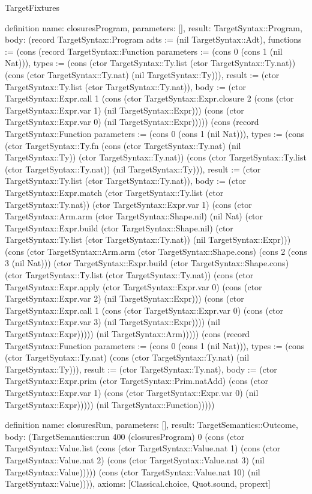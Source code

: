 \begin{lexlean}{TargetFixtures}
\begin{semanticmodule}
definition{
  name: closuresProgram,
  parameters: [],
  result: TargetSyntax::Program,
  body: (record TargetSyntax::Program {adts := (nil TargetSyntax::Adt), functions := (cons (record TargetSyntax::Function {parameters := (cons 0 (cons 1 (nil Nat))), types := (cons (ctor TargetSyntax::Ty.list (ctor TargetSyntax::Ty.nat)) (cons (ctor TargetSyntax::Ty.nat) (nil TargetSyntax::Ty))), result := (ctor TargetSyntax::Ty.list (ctor TargetSyntax::Ty.nat)), body := (ctor TargetSyntax::Expr.call 1 (cons (ctor TargetSyntax::Expr.closure 2 (cons (ctor TargetSyntax::Expr.var 1) (nil TargetSyntax::Expr))) (cons (ctor TargetSyntax::Expr.var 0) (nil TargetSyntax::Expr))))}) (cons (record TargetSyntax::Function {parameters := (cons 0 (cons 1 (nil Nat))), types := (cons (ctor TargetSyntax::Ty.fn (cons (ctor TargetSyntax::Ty.nat) (nil TargetSyntax::Ty)) (ctor TargetSyntax::Ty.nat)) (cons (ctor TargetSyntax::Ty.list (ctor TargetSyntax::Ty.nat)) (nil TargetSyntax::Ty))), result := (ctor TargetSyntax::Ty.list (ctor TargetSyntax::Ty.nat)), body := (ctor TargetSyntax::Expr.match (ctor TargetSyntax::Ty.list (ctor TargetSyntax::Ty.nat)) (ctor TargetSyntax::Expr.var 1) (cons (ctor TargetSyntax::Arm.arm (ctor TargetSyntax::Shape.nil) (nil Nat) (ctor TargetSyntax::Expr.build (ctor TargetSyntax::Shape.nil) (ctor TargetSyntax::Ty.list (ctor TargetSyntax::Ty.nat)) (nil TargetSyntax::Expr))) (cons (ctor TargetSyntax::Arm.arm (ctor TargetSyntax::Shape.cons) (cons 2 (cons 3 (nil Nat))) (ctor TargetSyntax::Expr.build (ctor TargetSyntax::Shape.cons) (ctor TargetSyntax::Ty.list (ctor TargetSyntax::Ty.nat)) (cons (ctor TargetSyntax::Expr.apply (ctor TargetSyntax::Expr.var 0) (cons (ctor TargetSyntax::Expr.var 2) (nil TargetSyntax::Expr))) (cons (ctor TargetSyntax::Expr.call 1 (cons (ctor TargetSyntax::Expr.var 0) (cons (ctor TargetSyntax::Expr.var 3) (nil TargetSyntax::Expr)))) (nil TargetSyntax::Expr))))) (nil TargetSyntax::Arm))))}) (cons (record TargetSyntax::Function {parameters := (cons 0 (cons 1 (nil Nat))), types := (cons (ctor TargetSyntax::Ty.nat) (cons (ctor TargetSyntax::Ty.nat) (nil TargetSyntax::Ty))), result := (ctor TargetSyntax::Ty.nat), body := (ctor TargetSyntax::Expr.prim (ctor TargetSyntax::Prim.natAdd) (cons (ctor TargetSyntax::Expr.var 1) (cons (ctor TargetSyntax::Expr.var 0) (nil TargetSyntax::Expr))))}) (nil TargetSyntax::Function))))})
}

definition{
  name: closuresRun,
  parameters: [],
  result: TargetSemantics::Outcome,
  body: (TargetSemantics::run 400 (closuresProgram) 0 (cons (ctor TargetSyntax::Value.list (cons (ctor TargetSyntax::Value.nat 1) (cons (ctor TargetSyntax::Value.nat 2) (cons (ctor TargetSyntax::Value.nat 3) (nil TargetSyntax::Value))))) (cons (ctor TargetSyntax::Value.nat 10) (nil TargetSyntax::Value)))),
  axioms: [Classical.choice, Quot.sound, propext]
}


\end{semanticmodule}
\end{lexlean}
